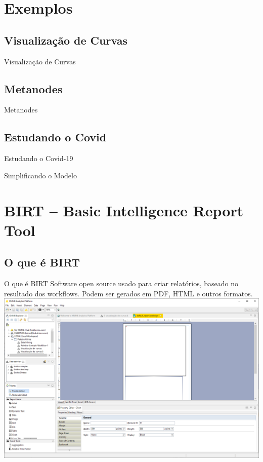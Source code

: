 \documentclass{beamer}
\begin{document}
\section{Exemplos}

\subsection{Visualização de Curvas}
\begin{frame}{Visualização de Curvas}
    \centering
    
\end{frame}


\subsection{Metanodes}
\begin{frame}{Metanodes}
    \centering
    
\end{frame}

\subsection{Estudando o Covid}
\begin{frame}{Estudando o Covid-19}
    \centering
    
\end{frame}

\begin{frame}{Simplificando o Modelo}
    \centering
    
\end{frame}


\section{BIRT -- Basic Intelligence Report Tool}

\subsection{O que é BIRT}
\begin{frame}{O que é BIRT}
Software open source usado para criar relatórios, baseado no resultado dos workflows.
Podem ser gerados em PDF, HTML e outros formatos.
\vfill
\centering
\includegraphics[height=0.4\textheight]{Images/birtscreen.png}
\end{frame} 
\end{document}
